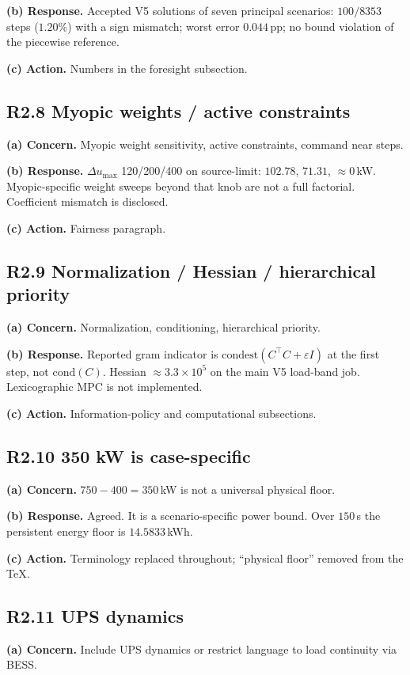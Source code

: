 \documentclass[11pt]{article}
\begin{document}
\textbf{(b) Response.} Accepted V5 solutions of seven principal scenarios: $100/8353$ steps ($1.20\%$) with a sign mismatch; worst error $0.044$\,pp; no bound violation of the piecewise reference.

\textbf{(c) Action.} Numbers in the foresight subsection.

\subsection*{R2.8 Myopic weights / active constraints}
\textbf{(a) Concern.} Myopic weight sensitivity, active constraints, command near steps.

\textbf{(b) Response.} $\Delta u_{\max}$ 120/200/400 on source-limit: $102.78$, $71.31$, $\approx 0$\,kW. Myopic-specific weight sweeps beyond that knob are not a full factorial. Coefficient mismatch is disclosed.

\textbf{(c) Action.} Fairness paragraph.

\subsection*{R2.9 Normalization / Hessian / hierarchical priority}
\textbf{(a) Concern.} Normalization, conditioning, hierarchical priority.

\textbf{(b) Response.} Reported gram indicator is $\mathrm{condest}(C^\top C+\varepsilon I)$ at the first step, not $\mathrm{cond}(C)$. Hessian $\approx 3.3\times 10^{5}$ on the main V5 load-band job. Lexicographic MPC is not implemented.

\textbf{(c) Action.} Information-policy and computational subsections.

\subsection*{R2.10 350 kW is case-specific}
\textbf{(a) Concern.} $750-400=350$\,kW is not a universal physical floor.

\textbf{(b) Response.} Agreed. It is a scenario-specific power bound. Over $150$\,s the persistent energy floor is $14.5833$\,kWh.

\textbf{(c) Action.} Terminology replaced throughout; ``physical floor'' removed from the TeX.

\subsection*{R2.11 UPS dynamics}
\textbf{(a) Concern.} Include UPS dynamics or restrict language to load continuity via BESS.
\end{document}
